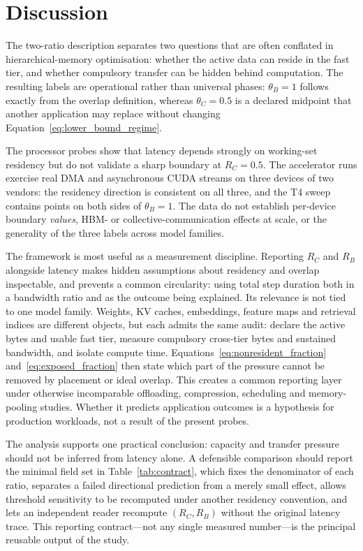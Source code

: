 \section*{Discussion}
\label{sec:discussion}

The two-ratio description separates two questions that are often conflated in
hierarchical-memory optimisation: whether the active data can reside in the
fast tier, and whether compulsory transfer can be hidden behind computation.
The resulting labels are operational rather than universal phases:
$\theta_B=1$ follows exactly from the overlap definition, whereas
$\theta_C=0.5$ is a declared midpoint that another application may replace
without changing Equation~\eqref{eq:lower_bound_regime}.

The processor probes show that latency depends strongly on working-set
residency but do not validate a sharp boundary at $R_C=0.5$. The accelerator
runs exercise real DMA and asynchronous CUDA streams on three devices of two
vendors: the residency direction is consistent on all three, and the T4 sweep
contains points on both sides of $\theta_B=1$. The data do not establish
per-device boundary \emph{values}, HBM- or collective-communication effects at
scale, or the generality of the three labels across model families.

The framework is most useful as a measurement discipline. Reporting $R_C$ and
$R_B$ alongside latency makes hidden assumptions about residency and overlap
inspectable, and prevents a common circularity: using total step duration both
in a bandwidth ratio and as the outcome being explained. Its relevance is not
tied to one model family. Weights, KV caches, embeddings, feature maps and
retrieval indices are different objects, but each admits the same audit:
declare the active bytes and usable fast tier, measure compulsory cross-tier
bytes and sustained bandwidth, and isolate compute time.
Equations~\eqref{eq:nonresident_fraction} and~\eqref{eq:exposed_fraction} then
state which part of the pressure cannot be removed by placement or ideal
overlap. This creates a common reporting layer under otherwise incomparable
offloading, compression, scheduling and memory-pooling studies. Whether it
predicts application outcomes is a hypothesis for production workloads, not a
result of the present probes.

The analysis supports one practical conclusion: capacity and transfer pressure
should not be inferred from latency alone. A defensible comparison should report
the minimal field set in Table~\ref{tab:contract}, which fixes the denominator
of each ratio, separates a failed directional prediction from a merely small
effect, allows threshold sensitivity to be recomputed under another residency
convention, and lets an independent reader recompute $(R_C,R_B)$ without the
original latency trace. This reporting contract---not any single measured
number---is the principal reusable output of the study.

